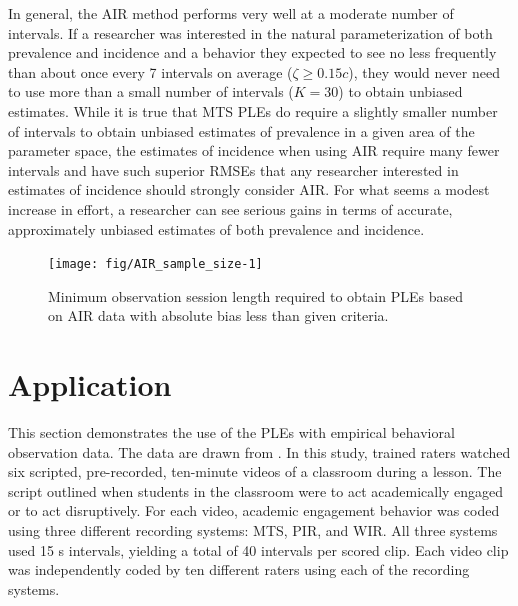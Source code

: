 \documentclass[man, noextraspace, floatsintext]{apa6}\usepackage[]{graphicx}\usepackage[]{color}
\newenvironment{knitrout}{}{} %
\begin{document}
In general, the AIR method performs very well at a moderate number of intervals. If a researcher was interested in the natural parameterization of both prevalence and incidence and a behavior they expected to see no less frequently than about once every 7 intervals on average ($\zeta \geq 0.15c$), they would never need to use more than a small number of intervals ($K = 30$) to obtain unbiased estimates. While it is true that MTS PLEs do require a slightly smaller number of intervals to obtain unbiased estimates of prevalence in a given area of the parameter space, the estimates of incidence when using AIR require many fewer intervals and have such superior RMSEs that any researcher interested in estimates of incidence should strongly consider AIR. For what seems a modest increase in effort, a researcher can see serious gains in terms of accurate, approximately unbiased estimates of both prevalence and incidence.
\begin{knitrout}
\color{fgcolor}\begin{figure}[tb]

{\centering \texttt{[image: fig/AIR\_sample\_size-1]} 

}

\caption[Minimum observation session length required to obtain PLEs based on AIR data with absolute bias less than given criteria]{Minimum observation session length required to obtain PLEs based on AIR data with absolute bias less than given criteria.}\label{fig:AIR_sample_size}
\end{figure}


\end{knitrout}

\section{Application}
\label{sec:application}



This section demonstrates the use of the PLEs with empirical behavioral observation data. The data are drawn from \citet{Johnson2014}. 
In this study, trained raters watched six scripted, pre-recorded, ten-minute videos of a classroom during a lesson. 
The script outlined when students in the classroom were to act academically engaged or to act disruptively. 
For each video, academic engagement behavior was coded using three different recording systems: MTS, PIR, and WIR. 
All three systems used 15 s intervals, yielding a total of 40 intervals per scored clip.
Each video clip was independently coded by ten different raters using each of the recording systems. 
\end{document}
